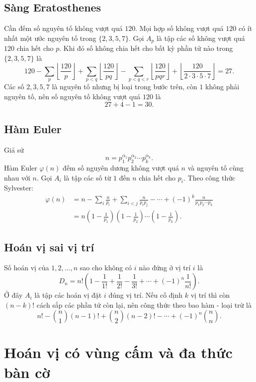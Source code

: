 \documentclass[11pt]{article}
\newcommand{\C}[2]{\binom{#1}{#2}}
\begin{document}
\subsection{Sàng Eratosthenes}

Cần đếm số nguyên tố không vượt quá \(120\). Mọi hợp số không vượt quá \(120\)
có ít nhất một ước nguyên tố trong \(\{2,3,5,7\}\). Gọi \(A_p\) là tập các số
không vượt quá \(120\) chia hết cho \(p\). Khi đó số không chia hết cho bất kỳ
phần tử nào trong \(\{2,3,5,7\}\) là
\[
  120-\sum_p\left\lfloor\frac{120}{p}\right\rfloor
  +\sum_{p<q}\left\lfloor\frac{120}{pq}\right\rfloor
  -\sum_{p<q<r}\left\lfloor\frac{120}{pqr}\right\rfloor
  +\left\lfloor\frac{120}{2\cdot3\cdot5\cdot7}\right\rfloor
  =27.
\]
Các số \(2,3,5,7\) là nguyên tố nhưng bị loại trong bước trên, còn \(1\)
không phải nguyên tố, nên số nguyên tố không vượt quá \(120\) là
\[
  27+4-1=30.
\]

\subsection{Hàm Euler}

Giả sử
\[
  n=p_1^{\alpha_1}p_2^{\alpha_2}\cdots p_k^{\alpha_k}.
\]
Hàm Euler \(\varphi(n)\) đếm số nguyên dương không vượt quá \(n\) và nguyên
tố cùng nhau với \(n\). Gọi \(A_i\) là tập các số từ \(1\) đến \(n\) chia hết
cho \(p_i\). Theo công thức Sylvester:
\[
\begin{aligned}
\varphi(n)
&=n-\sum_i\frac{n}{p_i}
 +\sum_{i<j}\frac{n}{p_ip_j}
 -\cdots
 +(-1)^k\frac{n}{p_1p_2\cdots p_k}\\
&=n\left(1-\frac1{p_1}\right)
    \left(1-\frac1{p_2}\right)\cdots
    \left(1-\frac1{p_k}\right).
\end{aligned}
\]

\subsection{Hoán vị sai vị trí}

Số hoán vị của \(1,2,\ldots,n\) sao cho không có \(i\) nào đứng ở vị trí
\(i\) là
\[
  D_n
  =n!\left(1-\frac1{1!}+\frac1{2!}-\frac1{3!}
  +\cdots+(-1)^n\frac1{n!}\right).
\]
Ở đây \(A_i\) là tập các hoán vị đặt \(i\) đúng vị trí. Nếu cố định \(k\) vị
trí thì còn \((n-k)!\) cách sắp các phần tử còn lại, nên công thức theo
bao hàm - loại trừ là
\[
  n!-\C n1(n-1)!+\C n2(n-2)!-\cdots+(-1)^n\C nn.
\]

\section{Hoán vị có vùng cấm và đa thức bàn cờ}
\end{document}
